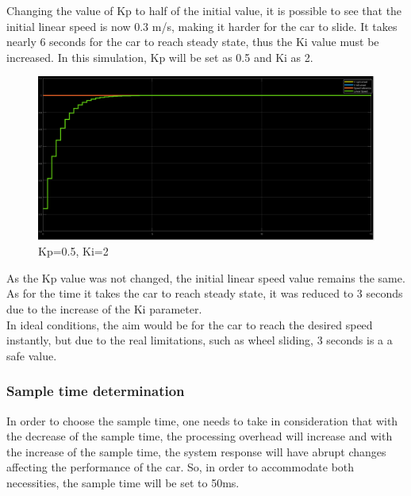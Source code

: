 Changing the value of Kp to half of the initial value, it is possible to see that the initial linear speed is now 0.3 m/s, making it harder for the car to slide. It takes nearly 6 seconds for the car to reach steady state, thus the Ki value must be increased.
In this simulation, Kp will be set as 0.5 and Ki as 2.
\begin{figure}[!h]
\centering
\includegraphics[width=1.0\textwidth]{./img/pid052.png}
\caption {\label{fig:pid1 - p05i2}Kp=0.5, Ki=2}
\end{figure}
As the Kp value was not changed, the initial linear speed value remains the same. As for the time it takes the car to reach steady state, it was reduced to 3 seconds due to the increase of the Ki parameter.\\
In ideal conditions, the aim would be for the car to reach the desired speed
instantly, but due to the real limitations, such as wheel sliding, 3 seconds is
a a safe value.
%
\subsubsection{Sample time determination}
In order to choose the sample time, one needs to take in consideration that with the decrease of the sample time, the processing overhead will increase and with the increase of the sample time, the system response will have abrupt changes affecting the performance of the car. So, in order to accommodate both necessities, the sample time will be set to 50ms.
